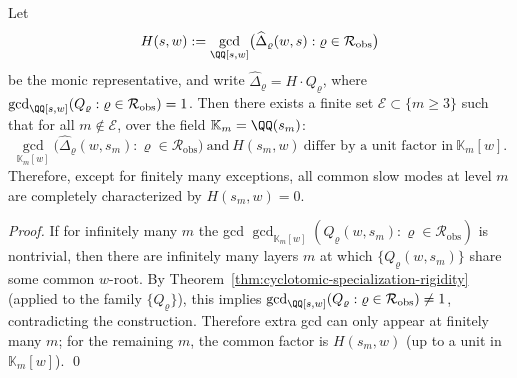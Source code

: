 \begin{theorem}\label{thm:cyclotomic-gcd-stability}
Let
\[
H(s,w):=\gcd_{\QQ[s,w]}\bigl(\widehat{\Delta}_{\varrho}(w,s):\varrho\in\mathcal{R}_{\mathrm{obs}}\bigr)
\]
be the monic representative, and write \(\widehat{\Delta}_{\varrho}=H\cdot Q_{\varrho}\), where
\(
\gcd_{\QQ[s,w]}(Q_{\varrho}:\varrho\in\mathcal{R}_{\mathrm{obs}})=1
\).
Then there exists a finite set \(\mathcal{E}\subset\{m\ge 3\}\) such that for all \(m\notin\mathcal{E}\), over the field \(\mathbb{K}_m=\QQ(s_m)\):
\[
\gcd_{\mathbb{K}_m[w]}\bigl(\widehat{\Delta}_{\varrho}(w,s_m):\varrho\in\mathcal{R}_{\mathrm{obs}}\bigr)
\ \text{and}\ H(s_m,w)\ \text{differ by a unit factor in}\ \mathbb{K}_m[w].
\]
Therefore, except for finitely many exceptions, all common slow modes at level \(m\) are completely characterized by \(H(s_m,w)=0\).
\end{theorem}
\begin{proof}
If for infinitely many \(m\) the gcd
\(
\gcd_{\mathbb{K}_m[w]}(Q_{\varrho}(w,s_m):\varrho\in\mathcal{R}_{\mathrm{obs}})
\)
is nontrivial, then there are infinitely many layers \(m\) at which \(\{Q_{\varrho}(w,s_m)\}\) share some common \(w\)-root.
By Theorem~\ref{thm:cyclotomic-specialization-rigidity} (applied to the family \(\{Q_{\varrho}\}\)), this implies
\(
\gcd_{\QQ[s,w]}(Q_{\varrho}:\varrho\in\mathcal{R}_{\mathrm{obs}})\neq 1
\), contradicting the construction.
Therefore extra gcd can only appear at finitely many \(m\); for the remaining \(m\), the common factor is \(H(s_m,w)\) (up to a unit in \(\mathbb{K}_m[w]\)). \qed
\end{proof}

